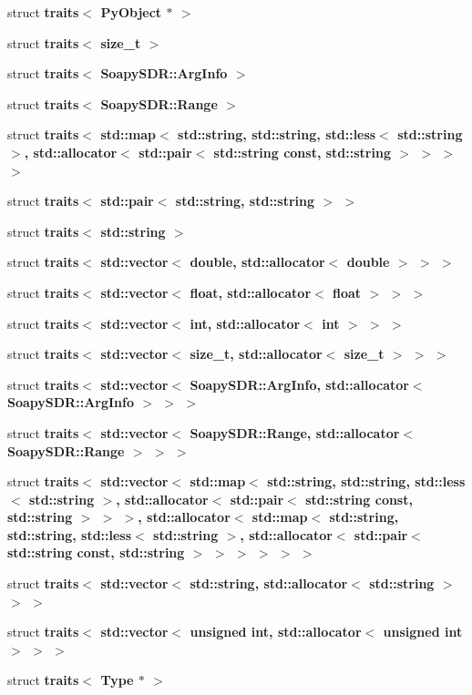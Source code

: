 \begin{DoxyCompactItemize}
struct {\bf traits$<$ Py\+Object $\ast$ $>$}
\item 
struct {\bf traits$<$ size\+\_\+t $>$}
\item 
struct {\bf traits$<$ Soapy\+S\+D\+R\+::\+Arg\+Info $>$}
\item 
struct {\bf traits$<$ Soapy\+S\+D\+R\+::\+Range $>$}
\item 
struct {\bfseries traits$<$ std\+::map$<$ std\+::string, std\+::string, std\+::less$<$ std\+::string $>$, std\+::allocator$<$ std\+::pair$<$ std\+::string const, std\+::string $>$ $>$ $>$ $>$}
\item 
struct {\bfseries traits$<$ std\+::pair$<$ std\+::string, std\+::string $>$ $>$}
\item 
struct {\bfseries traits$<$ std\+::string $>$}
\item 
struct {\bfseries traits$<$ std\+::vector$<$ double, std\+::allocator$<$ double $>$ $>$ $>$}
\item 
struct {\bfseries traits$<$ std\+::vector$<$ float, std\+::allocator$<$ float $>$ $>$ $>$}
\item 
struct {\bfseries traits$<$ std\+::vector$<$ int, std\+::allocator$<$ int $>$ $>$ $>$}
\item 
struct {\bfseries traits$<$ std\+::vector$<$ size\+\_\+t, std\+::allocator$<$ size\+\_\+t $>$ $>$ $>$}
\item 
struct {\bfseries traits$<$ std\+::vector$<$ Soapy\+S\+D\+R\+::\+Arg\+Info, std\+::allocator$<$ Soapy\+S\+D\+R\+::\+Arg\+Info $>$ $>$ $>$}
\item 
struct {\bfseries traits$<$ std\+::vector$<$ Soapy\+S\+D\+R\+::\+Range, std\+::allocator$<$ Soapy\+S\+D\+R\+::\+Range $>$ $>$ $>$}
\item 
struct {\bfseries traits$<$ std\+::vector$<$ std\+::map$<$ std\+::string, std\+::string, std\+::less$<$ std\+::string $>$, std\+::allocator$<$ std\+::pair$<$ std\+::string const, std\+::string $>$ $>$ $>$, std\+::allocator$<$ std\+::map$<$ std\+::string, std\+::string, std\+::less$<$ std\+::string $>$, std\+::allocator$<$ std\+::pair$<$ std\+::string const, std\+::string $>$ $>$ $>$ $>$ $>$ $>$}
\item 
struct {\bfseries traits$<$ std\+::vector$<$ std\+::string, std\+::allocator$<$ std\+::string $>$ $>$ $>$}
\item 
struct {\bfseries traits$<$ std\+::vector$<$ unsigned int, std\+::allocator$<$ unsigned int $>$ $>$ $>$}
\item 
struct {\bf traits$<$ Type $\ast$ $>$}
\item 

\end{DoxyCompactItemize}

